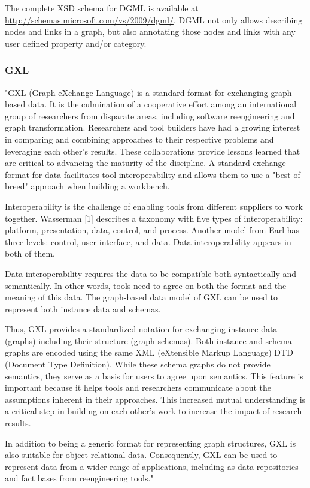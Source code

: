 \documentclass[a4paper,oneside]{article}
\begin{document}
The complete XSD schema for DGML is available at \url{http://schemas.microsoft.com/vs/2009/dgml/}. DGML not only allows describing nodes and links in a graph, but also annotating those nodes and links with any user defined property and/or category.

\subsubsection{GXL}
"GXL (Graph eXchange Language) is a standard format for exchanging graph-based data. It is the culmination of a cooperative effort among an international group of researchers from disparate areas, including software reengineering and graph transformation. Researchers and tool builders have had a growing interest in comparing and combining approaches to their respective problems and leveraging each other's results. These collaborations provide lessons learned that are critical to advancing the maturity of the discipline. A standard exchange format for data facilitates tool interoperability and allows them to use a "best of breed" approach when building a workbench.


Interoperability is the challenge of enabling tools from different suppliers to work together. Wasserman [1] describes a taxonomy with five types of interoperability: platform, presentation, data, control, and process. Another model from Earl has three levels: control, user interface, and data. Data interoperability appears in both of them.


Data interoperability requires the data to be compatible both syntactically and semantically. In other words, tools need to agree on both the format and the meaning of this data. The graph-based data model of GXL can be used to represent both instance data and schemas.


Thus, GXL provides a standardized notation for exchanging instance data (graphs) including their structure (graph schemas). Both instance and schema graphs are encoded using the same XML (eXtensible Markup Language) DTD (Document Type Definition). While these schema graphs do not provide semantics, they serve as a basis for users to agree upon semantics. This feature is important because it helps tools and researchers communicate about the assumptions inherent in their approaches. This increased mutual understanding is a critical step in building on each other's work to increase the impact of research results.


In addition to being a generic format for representing graph structures, GXL is also suitable for object-relational data. Consequently, GXL can be used to represent data from a wider range of applications, including as data repositories and fact bases from reengineering tools."~\cite{GXL}
\end{document}

